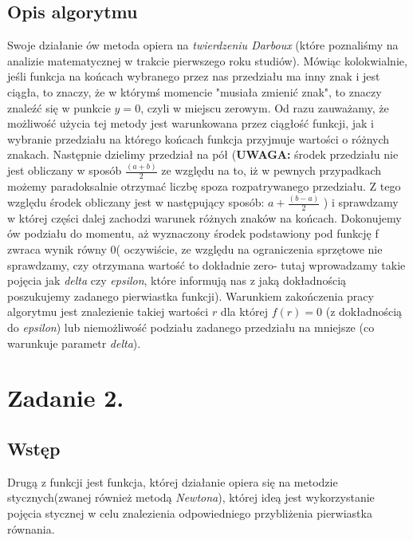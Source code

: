 \documentclass[a4paper,14pt]{report}
\begin{document}
  \section{Opis algorytmu}
  Swoje działanie ów metoda opiera na \textit{twierdzeniu Darboux} (które poznaliśmy na analizie matematycznej w trakcie pierwszego roku studiów). Mówiąc kolokwialnie, jeśli funkcja na końcach wybranego przez nas przedziału ma inny znak i jest ciągła, to znaczy, że w którymś momencie "musiała zmienić znak", to znaczy znaleźć się w punkcie $y=0$, czyli w miejscu zerowym. Od razu zauważamy, że możliwość użycia tej metody jest warunkowana przez ciągłość funkcji, jak i wybranie przedziału na którego końcach funkcja przyjmuje wartości o różnych znakach. Następnie dzielimy przedział na pół (\textbf{UWAGA: } środek przedziału nie jest obliczany w sposób $\frac{(a+b)}{2}$ ze względu na to, iż w pewnych przypadkach możemy paradoksalnie otrzymać liczbę spoza rozpatrywanego przedziału. Z tego względu środek obliczany jest w następujący sposób: $a+\frac{(b-a)}{2}$ ) i sprawdzamy w której części dalej zachodzi warunek różnych znaków na końcach. Dokonujemy ów podziału do momentu, aż wyznaczony środek podstawiony pod funkcję f zwraca wynik równy 0( oczywiście, ze względu na ograniczenia sprzętowe nie sprawdzamy, czy otrzymana wartość to dokładnie zero- tutaj wprowadzamy takie pojęcia jak \textit{delta} czy \textit{epsilon}, które informują nas z jaką dokładnością poszukujemy zadanego pierwiastka funkcji).
  Warunkiem zakończenia pracy algorytmu jest znalezienie takiej wartości $r$ dla której $f(r)=0$ (z dokładnością do \textit{epsilon}) lub niemożliwość podziału zadanego przedziału na mniejsze (co warunkuje parametr \textit{delta}).

\chapter{Zadanie 2.}
  \section{Wstęp}
  Drugą z funkcji jest funkcja, której działanie opiera się na metodzie stycznych(zwanej również metodą \textit{Newtona}), której ideą jest wykorzystanie pojęcia stycznej w celu znalezienia odpowiedniego przybliżenia pierwiastka równania.
\end{document}
